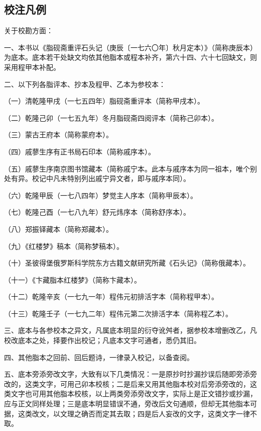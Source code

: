 \subsection*{校注凡例}


\par 关于校勘方面：
\par 一、本书以《脂砚斋重评石头记（庚辰〔一七六〇年〕秋月定本）》（简称庚辰本）为底本。底本若干处缺文均依其他脂本或程本补齐，第六十四、六十七回缺文，则采用程甲本补配。
\par 二、以下列各脂评本、抄本及程甲、乙本为参校本：
\par （一）清乾隆甲戌（一七五四年）脂砚斋重评本（简称甲戌本）。
\par （二）乾隆己卯（一七五九年）冬月脂砚斋四阅评本（简称己卯本）。
\par （三）蒙古王府本（简称蒙府本）。
\par （四）戚蓼生序有正书局石印本（简称戚序本）。
\par （五）戚蓼生序南京图书馆藏本（简称戚宁本。此本与戚序本为同一祖本，唯个别处有异。校记中凡未特别列出戚宁异文者，即与戚序本同）。
\par （六）乾隆甲辰（一七八四年）梦觉主人序本（简称甲辰本）。
\par （七）乾隆己酉（一七八九年）舒元炜序本（简称舒序本）。
\par （八）郑振铎藏本（简称郑藏本）。
\par （九）《红楼梦》稿本（简称梦稿本）。
\par （十）圣彼得堡俄罗斯科学院东方古籍文献研究所藏《石头记》（简称俄藏本）。
\par （十一）《卞藏脂本红楼梦》（简称卞藏本）。
\par （十二）乾隆辛亥（一七九一年）程伟元初排活字本（简称程甲本）。
\par （十三）乾隆壬子（一七九二年）程伟元第二次排活字本（简称程乙本）。
\par 三、底本与各参校本之异文，凡属底本明显的衍夺讹舛者，据参校本增删改乙，凡校改底本之处，择要作出校记；凡底本文字可通者，悉仍其旧。
\par 四、其他脂本之回前、回后题诗，一律录入校记，以备查阅。
\par 五、底本旁添旁改文字，大致有以下几类情况：一是原抄时抄漏抄误后随即旁添旁改的，这类文字，可用己卯本校核；二是后来又用其他脂本校对后旁添旁改的，这类文字也可用其他脂本校核，以上两类旁添旁改文字，实际上是正文错抄或抄漏，应与正文同样处理；三是底本明显错误不通，旁改后文句通顺，但却无其他脂本可据，这类改文，以文理之确否而定其去取；四是后人妄改的文字，这类文字一律不取。
